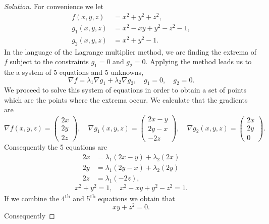 \begin{proof}[Solution]
    For convenience we let
    \[
        \begin{aligned}
            f(x,y,z)   & = x^2 + y^2 + z^2,          \\
            g_1(x,y,z) & = x^2 - xy + y^2 - z^2 - 1, \\
            g_2(x,y,z) & = x^2 + y^2 - 1.
        \end{aligned}
    \]
    In the language of the Lagrange multiplier method, we are finding the extrema of \(f\) subject to the constraints \(g_1=0\) and \(g_2 = 0\).
    Applying the method leads us to the a system of 5 equations and 5 unknowns,
    \[
        \nabla f  = \lambda_1 \nabla g_1  + \lambda_2 \nabla g_2,
        \quad
        g_1 = 0,
        \quad
        g_2 = 0.
    \]
    We proceed to solve this system of equations in order to obtain a set of points which are the points where the extrema occur.
    We calculate that the gradients are
    \[
        \nabla f (x,y,z) = \begin{pmatrix}
            2 x \\ 2y \\ 2z
        \end{pmatrix},
        \quad
        \nabla g_1(x,y,z) = \begin{pmatrix}
            2x-y \\ 2y - x \\ -2z
        \end{pmatrix},
        \quad
        \nabla g_2(x,y,z) = \begin{pmatrix}
            2x \\ 2y \\ 0
        \end{pmatrix}.
    \]
    Consequently the 5 equations are
    \[
        \begin{aligned}
            2x & = \lambda_1 ( 2x -y ) + \lambda_2(2x) \\
            2y & = \lambda_1 ( 2y - x) + \lambda_2(2y) \\
            2z & = \lambda_1(-2z),
        \end{aligned}
    \]
    \[
        x^2 + y^2 = 1,
        \quad
        x^2 - xy + y^2 - z^2 =1.
    \]
    If we combine the 4\textsuperscript{th} and 5\textsuperscript{th} equations we obtain that 
        \begin{equation}
            \label{eq:LagrangeA}
            xy + z^2 = 0.
        \end{equation}
    Consequently

\end{proof}
